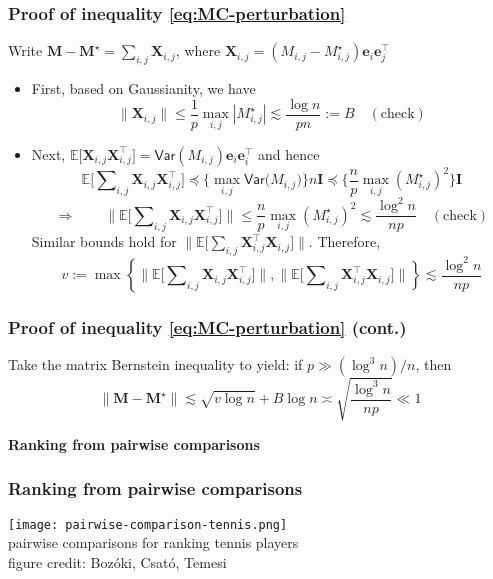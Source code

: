 \documentclass[compress,
mathserif,wide,%
]{beamer}
\begin{document}
\begin{frame}
	\frametitle{Proof of inequality \eqref{eq:MC-perturbation}}

{


Write ${\bm{M}}-\bm{M}^{\star} =\sum_{i,j}\bm{X}_{i,j}$, where $\bm{X}_{i,j}=({M}_{i,j}-M^{\star}_{i,j})\bm{e}_{i}\bm{e}_{j}^{\top}$
\begin{itemize}

\item First, based on Gaussianity, we have
\[
	\|\bm{X}_{i,j}\|\leq\frac{1}{p}\max_{i,j} |M^{\star}_{i,j}| \lesssim\frac{\log n}{pn}:=B \quad (\text{check})
\]


\item Next, $\mathbb{E}\big[\bm{X}_{i,j}\bm{X}_{i,j}^{\top}\big]=\mathsf{Var}({M}_{i,j})\bm{e}_{i}\bm{e}_{i}^{\top}$
and hence
\[
\mathbb{E}\big[\sum\nolimits _{i,j}\bm{X}_{i,j}\bm{X}_{i,j}^{\top}\big]\preceq\Big\{\max_{i,j}\mathsf{Var}\big({M}_{i,j}\big)\Big\} n\bm{I}\preceq\Big\{\frac{n}{p}\max_{i,j}(M^{\star}_{i,j})^{2}\Big\}\bm{I}
\]
\[
\Longrightarrow\qquad\big\|\mathbb{E}\big[\sum\nolimits _{i,j}\bm{X}_{i,j}\bm{X}_{i,j}^{\top}\big]\big\|\leq\frac{n}{p}\max_{i,j}(M^{\star}_{i,j})^{2}\lesssim\frac{\log^{2}n}{np}\quad(\text{check})
\]
Similar bounds hold for $\big\|\mathbb{E}\big[\sum\nolimits _{i,j}\bm{X}_{i,j}^{\top}\bm{X}_{i,j}\big]\big\|$.
Therefore, 
\[
v:=\max\left\{ \big\|\mathbb{E}\big[\sum\nolimits _{i,j}\bm{X}_{i,j}\bm{X}_{i,j}^{\top}\big]\big\|,\big\|\mathbb{E}\big[\sum\nolimits _{i,j}\bm{X}_{i,j}^{\top}\bm{X}_{i,j}\big]\big\|\right\} \lesssim\frac{\log^{2}n}{np}
\]


\end{itemize}



}

\end{frame}

\begin{frame}
	\frametitle{Proof of inequality \eqref{eq:MC-perturbation} (cont.)}
	Take the matrix Bernstein inequality to yield: if $p\gg (\log^{3}n )/n$,
then
\[
 \|\bm{M} - \bm{M}^\star\| \lesssim\sqrt{v\log n}+B\log n \asymp \sqrt{\frac{\log^{3} n }{np}}\ll1
\]
\end{frame}


\begin{frame}[plain]
	\vfill
	\centering
	\large \bf Ranking from pairwise comparisons
	\vfill
\end{frame}



\begin{frame}
	\frametitle{Ranking from pairwise comparisons}


	\begin{center}
		\texttt{[image: pairwise-comparison-tennis.png]} \\
		 pairwise comparisons for ranking tennis players  \\
		\hfill {\footnotesize figure credit: Boz\'{o}ki, Csat\'{o}, Temesi}
	\end{center}

\end{frame}
\end{document}
